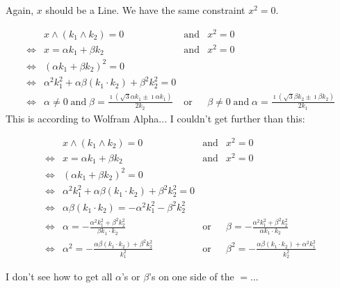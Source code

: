 \documentclass[a4paper,11pt,twoside,openright]{article}
\newcommand{\textgt}[1]{\textsf{#1}}
\newcommand{\pLine}{\textgt{Line}\xspace}
\newcommand{\en}{\ensuremath{\mathbin{\mbox{and}}}}
\newcommand{\of}{\ensuremath{\mathbin{\mbox{or}}}}
\newcommand{\eql}{\ensuremath{\Leftrightarrow}}
\begin{document}
Again, $x$ should be a \pLine.  We have the same constraint $x^2 = 0$.

\[
\begin{array}{rlcl}
 & x \wedge (k_1 \wedge k_2) = 0 &\en& x^2 = 0 \\
\eql& x = \alpha k_1 + \beta k_2 &\en& x^2 = 0 \\
\eql& \left(\alpha k_1 + \beta k_2\right)^2 = 0 \\
\eql& \alpha^2 k_1^2 + \alpha \beta (k_1 \cdot k_2) + \beta^2 k_2^2 = 0 \\
\eql& \alpha \not= 0 \en \beta = \frac{\imath \left( \sqrt{3} \alpha k_1 \pm \imath \alpha k_1\right)}{2k_2} &\of& \beta \not= 0 \en \alpha = \frac{\imath \left( \sqrt{3} \beta k_2 \pm \imath \beta k_2\right)}{2k_1}
\end{array}
\]
This is according to Wolfram Alpha... I couldn't get further than this:

\[
\begin{array}{rlcl}
 & x \wedge (k_1 \wedge k_2) = 0 &\en& x^2 = 0 \\
\eql& x = \alpha k_1 + \beta k_2 &\en& x^2 = 0 \\
\eql& \left(\alpha k_1 + \beta k_2\right)^2 = 0 \\
\eql& \alpha^2 k_1^2 + \alpha \beta (k_1 \cdot k_2) + \beta^2 k_2^2 = 0 \\
\eql& \alpha \beta (k_1 \cdot k_2) = -\alpha^2 k_1^2 - \beta^2 k_2^2 \\
\eql& \alpha = - \frac{\alpha^2 k_1^2 + \beta^2 k_2^2}{\beta k_1 \cdot k_2} &\of& \beta = - \frac{\alpha^2 k_1^2 + \beta^2 k_2^2}{\alpha k_1 \cdot k_2} \\
\eql& \alpha^2 = -\frac{\alpha \beta (k_1 \cdot k_2) + \beta^2 k_2^2}{k_1^2} &\of& \beta^2 = -\frac{\alpha \beta (k_1 \cdot k_2) + \alpha^2 k_1^2}{k_2^2}
\end{array}
\]

I don't see how to get all $\alpha$'s or $\beta$'s on one side of the $=$...
\end{document}
